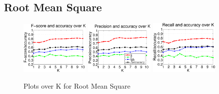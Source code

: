 	\subsection{Root Mean Square}
		\begin{figure}
		
			\centering\includegraphics[width=0.3\textwidth]{tex/appendices/test/rms11FP.png}
			\centering\includegraphics[width=0.3\textwidth]{tex/appendices/test/rms11_P.png}
			\centering\includegraphics[width=0.3\textwidth]{tex/appendices/test/rms11_R.png}
			
			\label{fig:eval:rms}
			\caption{Plots over K for Root Mean Square}
		\end{figure}

